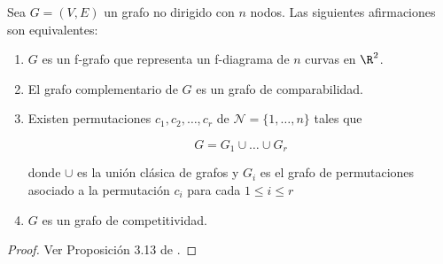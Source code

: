 \begin{prop}
Sea $G = (V,E)$ un grafo no dirigido con $n$ nodos. Las siguientes afirmaciones son equivalentes:

\begin{enumerate}
\item $G$ es un f-grafo que representa un f-diagrama de $n$ curvas en $\R^2$.
\item El grafo complementario de $G$ es un grafo de comparabilidad.
\item Existen permutaciones $c_1,c_2, \dots, c_r$ de $\mathcal{N} = \{1,\dots,n\}$ tales que

\begin{equation*}
G = G_1 \cup \dots \cup G_r
\end{equation*}

donde $\cup$ es la unión clásica de grafos y $G_i$ es el grafo de permutaciones asociado a la permutación $c_i$ para cada $1 \leq i \leq r$

\item $G$ es un grafo de competitividad.

\end{enumerate}
\end{prop}

\begin{proof} \label{thm:relaciones_entre_grafos}
Ver Proposición 3.13 de \cite{ongraphsassociatedtosetsofrankings}.
\end{proof}

